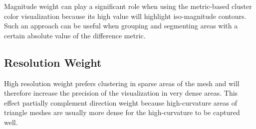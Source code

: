 Magnitude weight can play a significant role when using the metric-based cluster color visualization because its high value will highlight iso-magnitude contours. Such an approach can be useful when grouping and segmenting areas with a certain absolute value of the difference metric.
\subsection{Resolution Weight}

High resolution weight prefers clustering in sparse areas of the mesh and will therefore increase the precision of the visualization in very dense areas. This effect partially complement direction weight because high-curvature areas of triangle meshes are usually more dense for the high-curvature to be captured well.
